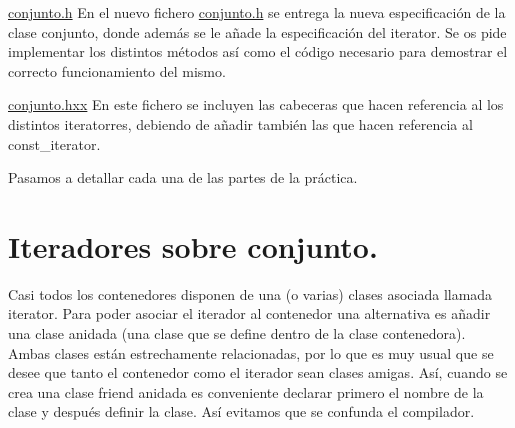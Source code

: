 \begin{DoxyItemize}
\item \hyperlink{conjunto_8h_source}{conjunto.\+h} En el nuevo fichero \hyperlink{conjunto_8h_source}{conjunto.\+h} se entrega la nueva especificación de la clase conjunto, donde además se le añade la especificación del iterator. Se os pide implementar los distintos métodos así como el código necesario para demostrar el correcto funcionamiento del mismo. \item \hyperlink{conjunto_8hxx_source}{conjunto.\+hxx} En este fichero se incluyen las cabeceras que hacen referencia al los distintos iteratorres, debiendo de añadir también las que hacen referencia al const\+\_\+iterator.\end{DoxyItemize}
Pasamos a detallar cada una de las partes de la práctica.\hypertarget{index_iterar}{}\section{Iteradores sobre conjunto.}\label{index_iterar}
Casi todos los contenedores disponen de una (o varias) clases asociada llamada iterator. Para poder asociar el iterador al contenedor una alternativa es añadir una clase anidada (una clase que se define dentro de la clase contenedora). Ambas clases están estrechamente relacionadas, por lo que es muy usual que se desee que tanto el contenedor como el iterador sean clases amigas. Así, cuando se crea una clase friend anidada es conveniente declarar primero el nombre de la clase y después definir la clase. Así evitamos que se confunda el compilador.


